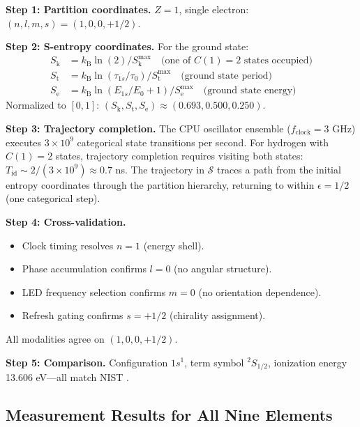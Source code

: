 \documentclass[11pt,a4paper]{article}
\theoremstyle{definition}
\theoremstyle{remark}
\newcommand{\kB}{k_{\mathrm{B}}}
\newcommand{\Sk}{S_{\mathrm{k}}}
\newcommand{\St}{S_{\mathrm{t}}}
\newcommand{\Se}{S_{\mathrm{e}}}
\newcommand{\Sspace}{\mathcal{S}}
\begin{document}
\textbf{Step 1: Partition coordinates.} $Z = 1$, single electron: $(n, l, m, s) = (1, 0, 0, +1/2)$.

\textbf{Step 2: S-entropy coordinates.} For the ground state:
\begin{align}
\Sk &= \kB \ln(2) / \Sk^{\max} \quad \text{(one of } C(1) = 2 \text{ states occupied)} \\
\St &= \kB \ln(\tau_{1s}/\tau_0) / \St^{\max} \quad \text{(ground state period)} \\
\Se &= \kB \ln(E_{1s}/E_0 + 1) / \Se^{\max} \quad \text{(ground state energy)}
\end{align}
Normalized to $[0,1]$: $(\Sk, \St, \Se) \approx (0.693, 0.500, 0.250)$.

\textbf{Step 3: Trajectory completion.} The CPU oscillator ensemble ($f_{\mathrm{clock}} = 3$ GHz) executes $3 \times 10^9$ categorical state transitions per second. For hydrogen with $C(1) = 2$ states, trajectory completion requires visiting both states: $T_{\mathrm{id}} \sim 2/(3 \times 10^9) \approx 0.7$ ns. The trajectory in $\Sspace$ traces a path from the initial entropy coordinates through the partition hierarchy, returning to within $\epsilon = 1/2$ (one categorical step).

\textbf{Step 4: Cross-validation.}
\begin{itemize}[nosep]
\item Clock timing resolves $n = 1$ (energy shell).
\item Phase accumulation confirms $l = 0$ (no angular structure).
\item LED frequency selection confirms $m = 0$ (no orientation dependence).
\item Refresh gating confirms $s = +1/2$ (chirality assignment).
\end{itemize}
All modalities agree on $(1, 0, 0, +1/2)$.

\textbf{Step 5: Comparison.} Configuration $1s^1$, term symbol ${}^2S_{1/2}$, ionization energy 13.606 eV---all match NIST \citep{nist_asd}.

\subsection{Measurement Results for All Nine Elements}
\end{document}
